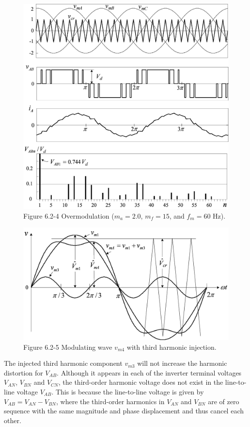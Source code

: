 \documentclass[letterpaper,12pt]{article}
\begin{document}
\begin{figure}[h]
	\centering
	\includegraphics[width=0.5\textheight]{graficos/img85.jpg}
	\caption{Figure 6.2-4 Overmodulation ($m_a = 2.0$, $m_f = 15$, and $f_m = 60$ Hz).}
\end{figure}
\FloatBarrier

\begin{figure}[h]
	\centering
	\includegraphics[width=0.5\textheight]{graficos/img86.jpg}
	\caption{Figure 6.2-5 Modulating wave $v_{m4}$ with third harmonic injection.}
\end{figure}
\FloatBarrier

The injected third harmonic component $v_{m3}$ will not increase the harmonic distortion for $V_{AB}$. Although it appears in each of the inverter terminal voltages $V_{AN}$, $V_{BN}$ and $V_{CN}$, the third-order harmonic voltage does not exist in the line-to-line voltage $V_{AB}$. This is because the line-to-line voltage is given by $V_{AB} = V_{AN} - V_{BN}$, where the third-order harmonics in $V_{AN}$ and $V_{BN}$ are of zero sequence with the same magnitude and phase displacement and thus cancel each other.
\end{document}
